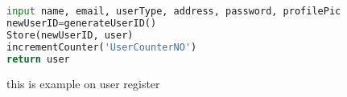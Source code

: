 \begin{lstlisting}[language=Python , caption=User register]
input name, email, userType, address, password, profilePic
newUserID=generateUserID()
Store(newUserID, user)
incrementCounter('UserCounterNO')
return user
\end{lstlisting}
this is example on user register